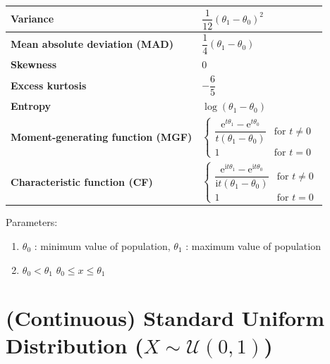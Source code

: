 \begin{customTableWrapper}{2}
\begin{longtable}{|m{6cm}|p{9cm}|}
    \textbf{Variance} &
    ${\displaystyle {\dfrac {1}{12}}(\theta_1-\theta_0)^{2}}$
    \\[1ex] \hline

    \textbf{Mean absolute deviation (MAD)} &
    ${\displaystyle {\dfrac {1}{4}}(\theta_1-\theta_0)}$
    \\[1ex] \hline

    \textbf{Skewness} &
    $0$
    \\ \hline

    \textbf{Excess kurtosis} &
    ${\displaystyle -{\dfrac {6}{5}}}$
    \\[1ex] \hline

    \textbf{Entropy} &
    ${\displaystyle \log(\theta_1-\theta_0)}$
    \\[1ex] \hline

    \textbf{Moment-generating function (MGF)} &
    ${\displaystyle {\begin{cases}{\dfrac {\mathrm {e} ^{t\theta_1}-\mathrm {e} ^{t\theta_0}}{t(\theta_1-\theta_0)}}&{\text{for }}t\neq 0\\1&{\text{for }}t=0\end{cases}}}$
    \\[1ex] \hline

    \textbf{Characteristic function (CF)} &
    ${\displaystyle {\begin{cases}{\dfrac {\mathrm {e} ^{\mathrm {i} t\theta_1}-\mathrm {e} ^{\mathrm {i} t\theta_0}}{\mathrm {i} t(\theta_1-\theta_0)}}&{\text{for }}t\neq 0\\1&{\text{for }}t=0\end{cases}}}$
    \\[1ex] \hline

\end{longtable}
\end{customTableWrapper}


Parameters:
\begin{enumerate}
    \item $\theta_0$ : minimum value of population, $\theta_1$ : maximum value of population

    \item 
        \hfill
        $\theta_0 < \theta_1$
        \hfill
        $\theta_0 \leq x \leq \theta_1$
        \hfill

\end{enumerate}



\section{(Continuous) Standard Uniform Distribution ($X \sim \mathcal{U}(0,1)$) \cite{ism-1}} \label{Standard Uniform Distribution}

